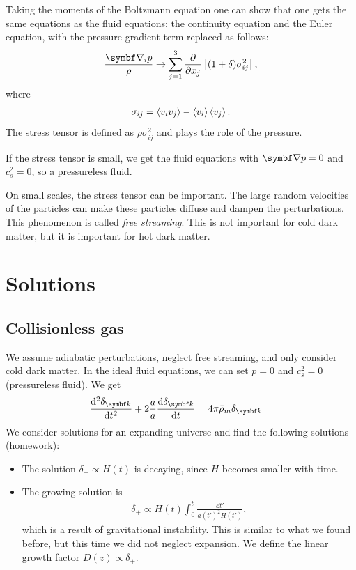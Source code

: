 Taking the moments of the Boltzmann equation one can show that one gets the same equations as the fluid equations: the continuity equation and the Euler equation, with the pressure gradient term replaced as follows:
\begin{align*}
	\frac{\Grad_i p}{\rho}
	\to \sum_{j=1}^3 \pdv{}{x_j}
	\left[ (1+\delta) \sigma_{ij}^2 \right],
\end{align*}
where
\begin{align*}
	\sigma_{ij} = \left\langle v_i v_j \right\rangle - \left\langle v_i \right\rangle \left\langle v_j \right\rangle.
\end{align*}
The stress tensor is defined as $\rho \sigma_{ij}^2$ and plays the role of the pressure.

If the stress tensor is small, we get the fluid equations with $\Grad p = 0$ and $c_s^2=0$, so a pressureless fluid.

On small scales, the stress tensor can be important. The large random velocities of the particles can make these particles diffuse and dampen the perturbations. This phenomenon is called \emph{free streaming}. This is not important for cold dark matter, but it is important for hot dark matter.




\section{Solutions}

\subsection{Collisionless gas}
We assume adiabatic perturbations, neglect free streaming, and only consider cold dark matter. In the ideal fluid equations, we can set $p=0$ and $c_s^2 = 0$ (pressureless fluid). We get
\begin{align*}
	\dv[2]{\delta_{\vec{k}}}{t}
	+ 2 \frac{\dot{a}}{a} \dv{\delta_{\vec{k}}}{t}
	&= 4 \pi \bar{\rho}_m \delta_{\vec{k}}
\end{align*}
We consider solutions for an expanding universe and find the following solutions (homework):
\begin{itemize}
	\item The solution $\delta_- \propto H(t)$ is decaying, since $H$ becomes smaller with time.
	\item The growing solution is
	\begin{align*}
		\delta_+ \propto H(t) \int_0^t \frac{\dd{t'}}{a(t')^2 H(t')},
	\end{align*}
	which is a result of gravitational instability. This is similar to what we found before, but this time we did not neglect expansion. We define the linear growth factor $D(z) \propto \delta_+$.
\end{itemize}

